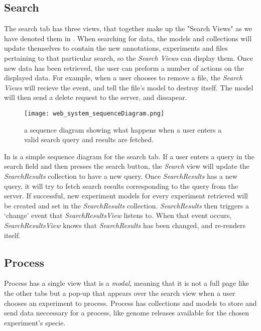 \label{sec:web_search}
\subsection{Search}
The search tab has three views, that together make up the "Search Views" as we have denoted them in . When searching for data, the models and collections will update themselves to contain the new annotations, experiments and files pertaining to that particular search, so the \textit{Search Views} can display them. Once new data has been retrieved, the user can preform a number of actions on the displayed data. For example, when a user chooses to remove a file, the \textit{Search Views} will recieve the event, and tell the file's model to destroy itself. The model will then send a delete request to the server, and dissapear.

 
\begin{figure}[h]
\centering
\texttt{[image: web\_system\_sequenceDiagram.png]}
\caption{\label{fig:web_system_sequenceDiagram}a sequence diagram showing what happens when a user enters a valid search query and results are fetched.}
\end{figure}

In  is a simple sequence diagram for the search tab. If a user enters a query in the search field and then presses the search button, the \textit{Search} view will update the \textit{SearchResults} collection to have a new query. Once \textit{SearchResults} has a new query, it will try to fetch search results corresponding to the query from the server. If successful, new experiment models for every experiment retrieved will be created and set in the \textit{SearchResults} collection. \textit{SearchResults} then triggers a ‘change’ event that \textit{SearchResultsView} listens to. When that event occurs, \textit{SearchResultsView} knows that \textit{SearchResults} has been changed, and re-renders itself.

\subsection{Process}
Process has a single view that is a \textit{modal}, meaning that it is not a full page like the other tabs but a pop-up that appears over the search view when a user chooses an experiment to process. Process has collections and models to store and send data neccessary for a process, like genome releases available for the chosen experiment's specie.   

